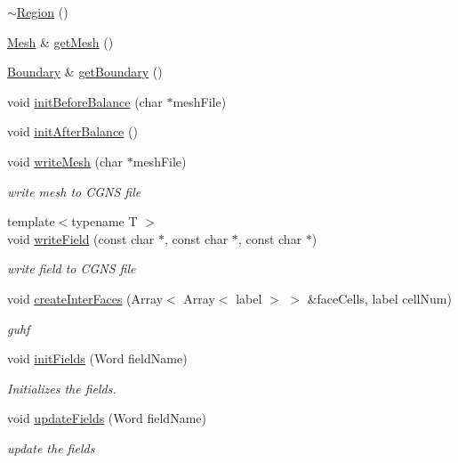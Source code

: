\begin{DoxyCompactItemize}
\hyperlink{classHSF_1_1Region_addfd3a382c30688582a760a25a2d8cbc}{$\sim$Region} ()
\item 
\hyperlink{classHSF_1_1Mesh}{Mesh} \& \hyperlink{classHSF_1_1Region_ab8349c21da1ed2153d3f0906dd571302}{getMesh} ()
\item 
\hyperlink{classHSF_1_1Boundary}{Boundary} \& \hyperlink{classHSF_1_1Region_aa887ee45c20b3b65acc17693d8cb4c45}{getBoundary} ()
\item 
void \hyperlink{classHSF_1_1Region_a9c38c5fc0d2fa5680eda4ab6a6933e4f}{initBeforeBalance} (char $\ast$meshFile)
\item 
void \hyperlink{classHSF_1_1Region_adb2b4937aae6fff73189a039b25eccfd}{initAfterBalance} ()
\item 
void \hyperlink{classHSF_1_1Region_a26f134480b539676bf18b26a96434c89}{writeMesh} (char $\ast$meshFile)
\begin{DoxyCompactList}\small\item\em write mesh to CGNS file \item\end{DoxyCompactList}\item 
{\footnotesize template$<$typename T $>$ }\\void \hyperlink{classHSF_1_1Region_a2298d4a70a05cfef042c077410c3c29b}{writeField} (const char $\ast$, const char $\ast$, const char $\ast$)
\begin{DoxyCompactList}\small\item\em write field to CGNS file \item\end{DoxyCompactList}\item 
void \hyperlink{classHSF_1_1Region_a39c7b59ebdc736618d652d53d1dace0b}{createInterFaces} (Array$<$ Array$<$ label $>$ $>$ \&faceCells, label cellNum)
\begin{DoxyCompactList}\small\item\em guhf \item\end{DoxyCompactList}\item 
void \hyperlink{classHSF_1_1Region_a04109e318bad70575bf6aa0f810913bf}{initFields} (Word fieldName)
\begin{DoxyCompactList}\small\item\em Initializes the fields. \item\end{DoxyCompactList}\item 
void \hyperlink{classHSF_1_1Region_a4a3da7e779636d389f013301006a02b4}{updateFields} (Word fieldName)
\begin{DoxyCompactList}\small\item\em update the fields \item\end{DoxyCompactList}\item 

\end{DoxyCompactItemize}

